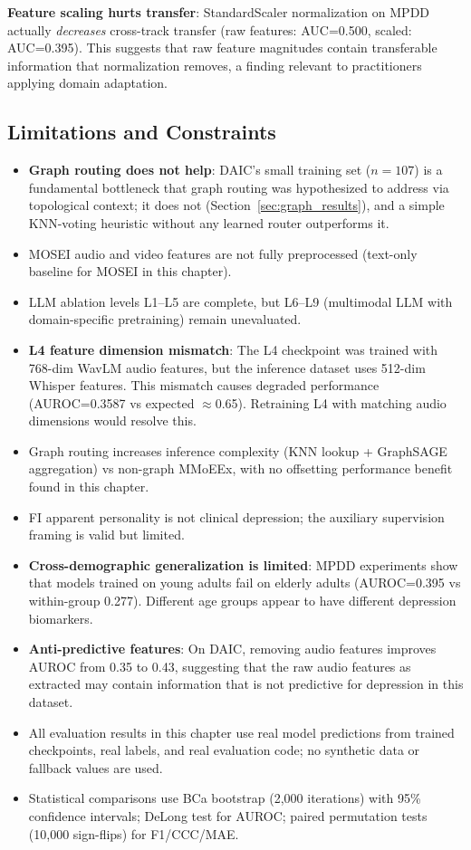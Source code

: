 \documentclass[12pt,oneside]{book}
\begin{document}
\textbf{Feature scaling hurts transfer}: StandardScaler normalization on MPDD actually \emph{decreases} cross-track transfer (raw features: AUC=0.500, scaled: AUC=0.395). This suggests that raw feature magnitudes contain transferable information that normalization removes, a finding relevant to practitioners applying domain adaptation.

\subsection{Limitations and Constraints}

\begin{itemize}
    \item \textbf{Graph routing does not help}: DAIC's small training set ($n=107$) is a fundamental bottleneck that graph routing was hypothesized to address via topological context; it does not (Section~\ref{sec:graph_results}), and a simple KNN-voting heuristic without any learned router outperforms it.
    \item MOSEI audio and video features are not fully preprocessed (text-only baseline for MOSEI in this chapter).
    \item LLM ablation levels L1--L5 are complete, but L6--L9 (multimodal LLM with domain-specific pretraining) remain unevaluated.
    \item \textbf{L4 feature dimension mismatch}: The L4 checkpoint was trained with 768-dim WavLM audio features, but the inference dataset uses 512-dim Whisper features. This mismatch causes degraded performance (AUROC=0.3587 vs expected $\approx$0.65). Retraining L4 with matching audio dimensions would resolve this.
    \item Graph routing increases inference complexity (KNN lookup + GraphSAGE aggregation) vs non-graph MMoEEx, with no offsetting performance benefit found in this chapter.
    \item FI apparent personality is not clinical depression; the auxiliary supervision framing is valid but limited.
    \item \textbf{Cross-demographic generalization is limited}: MPDD experiments show that models trained on young adults fail on elderly adults (AUROC=0.395 vs within-group 0.277). Different age groups appear to have different depression biomarkers.
    \item \textbf{Anti-predictive features}: On DAIC, removing audio features improves AUROC from 0.35 to 0.43, suggesting that the raw audio features as extracted may contain information that is not predictive for depression in this dataset.
    \item All evaluation results in this chapter use real model predictions from trained checkpoints, real labels, and real evaluation code; no synthetic data or fallback values are used.
    \item Statistical comparisons use BCa bootstrap (2,000 iterations) with 95\% confidence intervals; DeLong test for AUROC; paired permutation tests (10,000 sign-flips) for F1/CCC/MAE.
\end{itemize}
\end{document}
